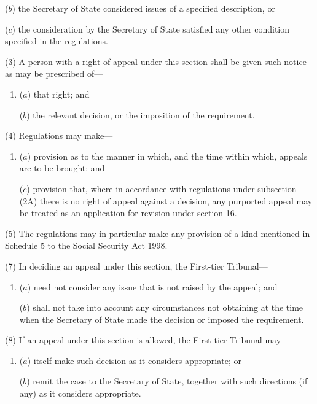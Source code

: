 \documentclass[a4paper]{article}
\begin{document}
{\begin{enumerate}
($b$) the Secretary of State considered issues of a specified description, or

($c$) the consideration by the Secretary of State satisfied any other condition specified in the regulations.
\end{enumerate}

(3) A person with a right of appeal under this section shall be given such notice as may be prescribed of---
\begin{enumerate}\item[]
($a$) that right; and

($b$) the relevant decision, or the imposition of the requirement.
\end{enumerate}

(4) Regulations may make---
\begin{enumerate}\item[]
($a$) provision as to the manner in which, and the time within which, appeals are to be brought; and

($c$) provision that, where in accordance with regulations under subsection (2A) there is no right of appeal against a decision, any purported appeal may be treated as an application for revision under section 16.
\end{enumerate}

(5)
The regulations may in particular make any provision of a kind mentioned in Schedule 5 to the Social Security Act 1998.

(7) In deciding an appeal under this section, the First-tier Tribunal---
\begin{enumerate}\item[]
($a$) need not consider any issue that is not raised by the appeal; and

($b$) shall not take into account any circumstances not obtaining at the time when the Secretary of State made the decision or imposed the requirement.
\end{enumerate}

(8) If an appeal under this section is allowed, the First-tier Tribunal may---
\begin{enumerate}\item[]
($a$) itself make such decision as it considers appropriate; or

($b$) remit the case to the Secretary of State, together with such directions (if any) as it considers appropriate.
\end{enumerate}


\amendment{

}}
\end{document}

